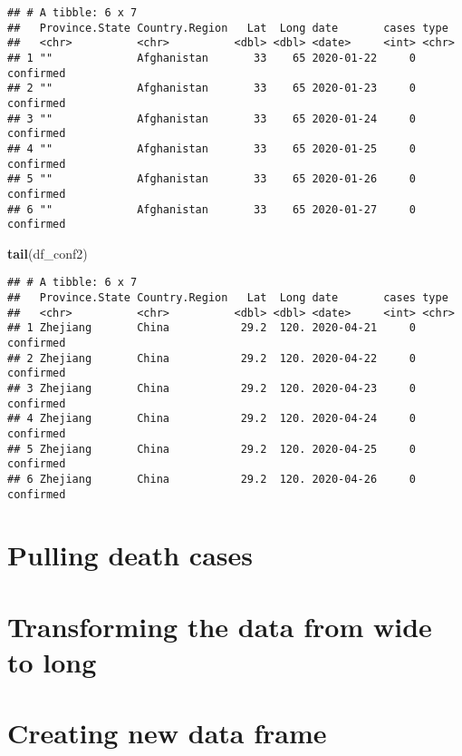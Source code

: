 \documentclass[
]{article}
\newenvironment{Shaded}{\begin{snugshade}}{\end{snugshade}}
\newcommand{\KeywordTok}[1]{\textcolor[rgb]{0.13,0.29,0.53}{\textbf{#1}}}
\newcommand{\NormalTok}[1]{#1}
\begin{document}
\begin{verbatim}
## # A tibble: 6 x 7
##   Province.State Country.Region   Lat  Long date       cases type     
##   <chr>          <chr>          <dbl> <dbl> <date>     <int> <chr>    
## 1 ""             Afghanistan       33    65 2020-01-22     0 confirmed
## 2 ""             Afghanistan       33    65 2020-01-23     0 confirmed
## 3 ""             Afghanistan       33    65 2020-01-24     0 confirmed
## 4 ""             Afghanistan       33    65 2020-01-25     0 confirmed
## 5 ""             Afghanistan       33    65 2020-01-26     0 confirmed
## 6 ""             Afghanistan       33    65 2020-01-27     0 confirmed
\end{verbatim}

\begin{Shaded}
\begin{Highlighting}[]
\KeywordTok{tail}\NormalTok{(df_conf2)}
\end{Highlighting}
\end{Shaded}

\begin{verbatim}
## # A tibble: 6 x 7
##   Province.State Country.Region   Lat  Long date       cases type     
##   <chr>          <chr>          <dbl> <dbl> <date>     <int> <chr>    
## 1 Zhejiang       China           29.2  120. 2020-04-21     0 confirmed
## 2 Zhejiang       China           29.2  120. 2020-04-22     0 confirmed
## 3 Zhejiang       China           29.2  120. 2020-04-23     0 confirmed
## 4 Zhejiang       China           29.2  120. 2020-04-24     0 confirmed
## 5 Zhejiang       China           29.2  120. 2020-04-25     0 confirmed
## 6 Zhejiang       China           29.2  120. 2020-04-26     0 confirmed
\end{verbatim}

\hypertarget{pulling-death-cases}{%
\section{Pulling death cases}\label{pulling-death-cases}}

\hypertarget{transforming-the-data-from-wide-to-long-1}{%
\section{Transforming the data from wide to
long}\label{transforming-the-data-from-wide-to-long-1}}

\hypertarget{creating-new-data-frame-1}{%
\section{Creating new data frame}\label{creating-new-data-frame-1}}
\end{document}
